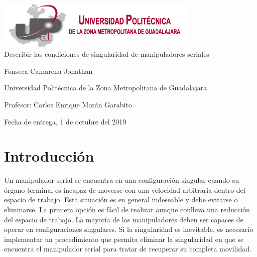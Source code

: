 \documentclass[11pt,a4paper,oldfontcommands,oneside]{memoir}
\begin{document}
\thispagestyle{empty}

{%
\sffamily
\centering
\Large

~\vspace{\fill}

\includegraphics[scale=1]{Escudo.png}\\
\vspace{50mm} %
{\huge 
Describir las condiciones de singularidad de manipuladores seriales
}
\vspace{1.5cm}

{\LARGE
 Fonseca Camarena Jonathan
}

\vspace{3.5cm}

Universidad Politécnica de la Zona Metropolitana de Guadalajara

\vspace{3.5cm}

Profesor: Carlos Enrique Morán Garabito

\vspace{\fill}

Fecha de entrega, 1 de octubre del 2019

}%

\vspace{4.5cm}




\tableofcontents*

\clearpage


\chapter{Introducción}
Un manipulador serial se encuentra en una configuración singular cuando su órgano terminal es incapaz de moverse con una velocidad arbitraria dentro del espacio de trabajo. Esta situación es en general indeseable y debe evitarse o eliminarse. La primera opción es fácil de realizar aunque conlleva una reducción del espacio de trabajo. La mayoría de los manipuladores deben ser capaces de operar en configuraciones singulares. Si la singularidad es inevitable, es necesario implementar un procedimiento que permita eliminar la singularidad en que se encuentra el manipulador serial para tratar de recuperar su completa movilidad. 
\end{document}
